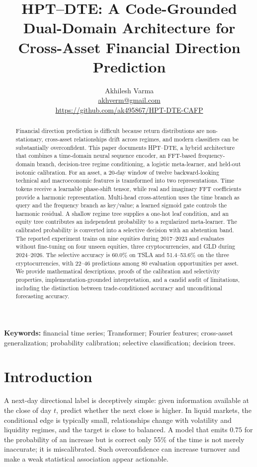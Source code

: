 \documentclass[11pt]{article}
\title{HPT--DTE: A Code-Grounded Dual-Domain Architecture for Cross-Asset Financial Direction Prediction}
\author{Akhilesh Varma\\\small \href{mailto:akhverm@gmail.com}{akhverm@gmail.com}\\[-2pt]\small \url{https://github.com/ak495867/HPT-DTE-CAFP}}
\date{}
\begin{document}
\maketitle
\begin{abstract}
Financial direction prediction is difficult because return distributions are non-stationary, cross-asset relationships drift across regimes, and modern classifiers can be substantially overconfident. This paper documents HPT--DTE, a hybrid architecture that combines a time-domain neural sequence encoder, an FFT-based frequency-domain branch, decision-tree regime conditioning, a logistic meta-learner, and held-out isotonic calibration. For an asset, a 20-day window of twelve backward-looking technical and macroeconomic features is transformed into two representations. Time tokens receive a learnable phase-shift tensor, while real and imaginary FFT coefficients provide a harmonic representation. Multi-head cross-attention uses the time branch as query and the frequency branch as key/value; a learned sigmoid gate controls the harmonic residual. A shallow regime tree supplies a one-hot leaf condition, and an equity tree contributes an independent probability to a regularized meta-learner. The calibrated probability is converted into a selective decision with an abstention band. The reported experiment trains on nine equities during 2017--2023 and evaluates without fine-tuning on four unseen equities, three cryptocurrencies, and GLD during 2024--2026. The selective accuracy is 60.0\% on TSLA and 51.4--53.6\% on the three cryptocurrencies, with 22--46 predictions among 80 evaluation opportunities per asset. We provide mathematical descriptions, proofs of the calibration and selectivity properties, implementation-grounded interpretation, and a candid audit of limitations, including the distinction between trade-conditioned accuracy and unconditional forecasting accuracy.
\end{abstract}

\textbf{Keywords:} financial time series; Transformer; Fourier features; cross-asset generalization; probability calibration; selective classification; decision trees.

\section{Introduction}
A next-day directional label is deceptively simple: given information available at the close of day $t$, predict whether the next close is higher. In liquid markets, the conditional edge is typically small, relationships change with volatility and liquidity regimes, and the target is close to balanced. A model that emits $0.75$ for the probability of an increase but is correct only 55\% of the time is not merely inaccurate; it is miscalibrated. Such overconfidence can increase turnover and make a weak statistical association appear actionable.
\end{document}
